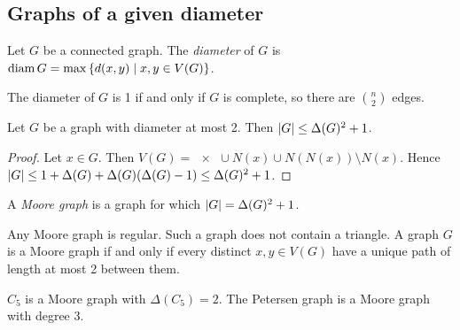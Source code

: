 \subsection{Graphs of a given diameter}
\begin{definition}
	Let \( G \) be a connected graph.
	The \emph{diameter} of \( G \) is \( \operatorname{diam} G = \max \qty{d(x,y) \mid x, y \in V(G)} \).
\end{definition}
\begin{remark}
	The diameter of \( G \) is 1 if and only if \( G \) is complete, so there are \( \binom n 2 \) edges.
\end{remark}
\begin{proposition}
	Let \( G \) be a graph with diameter at most 2.
	Then \( \abs{G} \leq \Delta(G)^2 + 1 \).
\end{proposition}
\begin{proof}
	Let \( x \in G \).
	Then \( V(G) = \qty{x} \cup N(x) \cup N(N(x)) \setminus N(x) \).
	Hence \( \abs{G} \leq 1 + \Delta(G) + \Delta(G)(\Delta(G) - 1) \leq \Delta(G)^2 + 1 \).
\end{proof}
\begin{definition}
	A \emph{Moore graph} is a graph for which \( \abs{G} = \Delta(G)^2 + 1 \).
\end{definition}
\begin{remark}
	Any Moore graph is regular.
	Such a graph does not contain a triangle.
	A graph \( G \) is a Moore graph if and only if every distinct \( x, y \in V(G) \) have a unique path of length at most 2 between them.
\end{remark}
\begin{example}
	\( C_5 \) is a Moore graph with \( \Delta(C_5) = 2 \).
	The Petersen graph is a Moore graph with degree 3.
\end{example}

